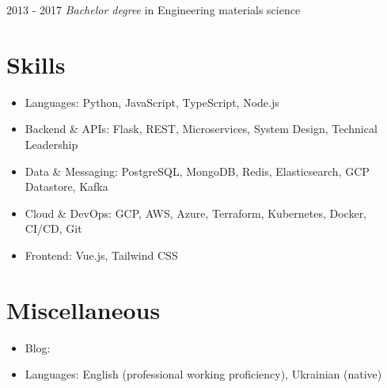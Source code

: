 \documentclass{resume}
\begin{document}
 {2013 - 2017}
\textit{Bachelor degree} in Engineering materials science 

\section{Skills}
\begin{itemize}[parsep=0.5ex]
    \item Languages: Python, JavaScript, TypeScript, Node.js
    \item Backend \& APIs: Flask, REST, Microservices, System Design, Technical Leadership
    \item Data \& Messaging: PostgreSQL, MongoDB, Redis, Elasticsearch, GCP Datastore, Kafka
    \item Cloud \& DevOps: GCP, AWS, Azure, Terraform, Kubernetes, Docker, CI/CD, Git
    \item Frontend: Vue.js, Tailwind CSS
\end{itemize}

\section{Miscellaneous}
\begin{itemize}[parsep=0.5ex]
  \item Blog: 
  \item Languages: English (professional working proficiency), Ukrainian (native)
\end{itemize}
\end{document}
